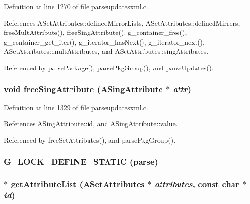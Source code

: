 Definition at line 1270 of file parseupdatesxml.c.

References ASet\-Attributes::defined\-Mirror\-Lists, ASet\-Attributes::defined\-Mirrors, free\-Mult\-Attribute(), free\-Sing\-Attribute(), g\_\-container\_\-free(), g\_\-container\_\-get\_\-iter(), g\_\-iterator\_\-has\-Next(), g\_\-iterator\_\-next(), ASet\-Attributes::mult\-Attributes, and ASet\-Attributes::sing\-Attributes.

Referenced by parse\-Package(), parse\-Pkg\-Group(), and parse\-Updates().
\subsubsection{\setlength{\rightskip}{0pt plus 5cm}void free\-Sing\-Attribute ({\bf ASing\-Attribute} $\ast$ {\em attr})\hspace{0.3cm}{\tt  [static]}}\label{parseupdatesxml_8c_a29}




Definition at line 1329 of file parseupdatesxml.c.

References ASing\-Attribute::id, and ASing\-Attribute::value.

Referenced by free\-Set\-Attributes(), and parse\-Pkg\-Group().
\subsubsection{\setlength{\rightskip}{0pt plus 5cm}G\_\-LOCK\_\-DEFINE\_\-STATIC (parse)}\label{parseupdatesxml_8c_a2}


\subsubsection{ $\ast$ get\-Attribute\-List ({\bf ASet\-Attributes} $\ast$ {\em attributes}, const char $\ast$ {\em id})\hspace{0.3cm}{\tt  [static]}}\label{parseupdatesxml_8c_a23}




